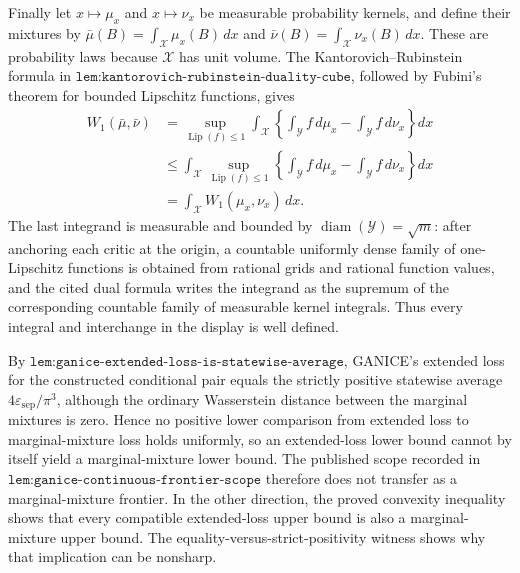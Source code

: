 Finally let \(x\mapsto\mu_x\) and \(x\mapsto\nu_x\) be measurable probability kernels, and define their mixtures by \(\bar\mu(B)=\int_{\mathcal X}\mu_x(B)\,dx\) and \(\bar\nu(B)=\int_{\mathcal X}\nu_x(B)\,dx\).  These are probability laws because \(\mathcal X\) has unit volume.  The Kantorovich--Rubinstein formula in \(\texttt{lem:kantorovich-rubinstein-duality-cube}\), followed by Fubini's theorem for bounded Lipschitz functions, gives
\[
\begin{aligned}
W_1(\bar\mu,\bar\nu)
&=\sup_{\operatorname{Lip}(f)\le1}
  \int_{\mathcal X}\left\{\int_{\mathcal Y}f\,d\mu_x-
  \int_{\mathcal Y}f\,d\nu_x\right\}dx\\
&\le\int_{\mathcal X}\sup_{\operatorname{Lip}(f)\le1}
 \left\{\int_{\mathcal Y}f\,d\mu_x-
 \int_{\mathcal Y}f\,d\nu_x\right\}dx\\
&=\int_{\mathcal X}W_1(\mu_x,\nu_x)\,dx.
\end{aligned}
\]
The last integrand is measurable and bounded by \(\operatorname{diam}(\mathcal Y)=\sqrt m\): after anchoring each critic at the origin, a countable uniformly dense family of one-Lipschitz functions is obtained from rational grids and rational function values, and the cited dual formula writes the integrand as the supremum of the corresponding countable family of measurable kernel integrals.  Thus every integral and interchange in the display is well defined.

By \(\texttt{lem:ganice-extended-loss-is-statewise-average}\), GANICE's extended loss for the constructed conditional pair equals the strictly positive statewise average \(4\varepsilon_{\mathrm{sep}}/\pi^3\), although the ordinary Wasserstein distance between the marginal mixtures is zero.  Hence no positive lower comparison from extended loss to marginal-mixture loss holds uniformly, so an extended-loss lower bound cannot by itself yield a marginal-mixture lower bound.  The published scope recorded in \(\texttt{lem:ganice-continuous-frontier-scope}\) therefore does not transfer as a marginal-mixture frontier.  In the other direction, the proved convexity inequality shows that every compatible extended-loss upper bound is also a marginal-mixture upper bound.  The equality-versus-strict-positivity witness shows why that implication can be nonsharp.
